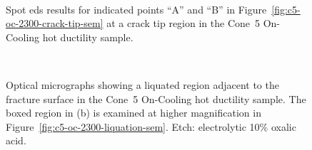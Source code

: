 {\begin{figure}
    \centering
     \\
    \caption{Spot \gls{eds} results for indicated points ``A'' and ``B'' in Figure~\ref{fig:c5-oc-2300-crack-tip-sem} at a crack tip region in the Cone~5 On-Cooling \protect{} hot ductility sample.}
    \label{fig:c5-oc-2300-crack-tip-eds}
\end{figure}


\begin{figure}
    \centering
     \\
    \caption[Optical micrographs showing a liquated region adjacent to the fracture surface in the Cone~5 On-Cooling \protect{} hot ductility sample.]{Optical micrographs showing a liquated region adjacent to the fracture surface in the Cone~5 On-Cooling \protect{} hot ductility sample. The boxed region in (b) is examined at higher magnification in Figure~\ref{fig:c5-oc-2300-liquation-sem}. Etch: electrolytic 10\% oxalic acid.}
    \label{fig:c5-oc-2300-liquation-olm}
\end{figure}

}
